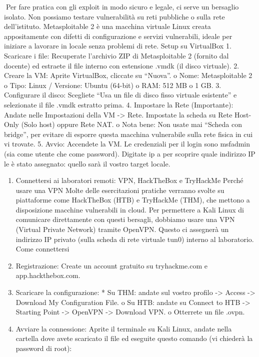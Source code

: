 \documentclass[11pt,a4paper]{article}
\providecommand{\tightlist}{%
  \setlength{\itemsep}{0pt}\setlength{\parskip}{0pt}}
\begin{document}
Per fare pratica con gli exploit in modo sicuro e legale, ci serve un
bersaglio isolato. Non possiamo testare vulnerabilità su reti pubbliche
o sulla rete dell'istituto. Metasploitable 2 è una macchina virtuale
Linux creata appositamente con difetti di configurazione e servizi
vulnerabili, ideale per iniziare a lavorare in locale senza problemi di
rete. Setup su VirtualBox 1. Scaricare i file: Recuperate l'archivio ZIP
di Metasploitable 2 (fornito dal docente) ed estraete il file interno
con estensione .vmdk (il disco virtuale). 2. Creare la VM: Aprite
VirtualBox, cliccate su ``Nuova''. o Nome: Metasploitable 2 o Tipo:
Linux / Versione: Ubuntu (64-bit) o RAM: 512 MB o 1 GB. 3. Configurare
il disco: Scegliete ``Usa un file di disco fisso virtuale esistente'' e
selezionate il file .vmdk estratto prima. 4. Impostare la Rete
(Importante): Andate nelle Impostazioni della VM -\textgreater{} Rete.
Impostate la scheda su Rete Host-Only (Solo host) oppure Rete NAT. o
Nota bene: Non usate mai ``Scheda con bridge'', per evitare di esporre
questa macchina vulnerabile sulla rete fisica in cui vi trovate. 5.
Avvio: Accendete la VM. Le credenziali per il login sono msfadmin (sia
come utente che come password). Digitate ip a per scoprire quale
indirizzo IP le è stato assegnato: quello sarà il vostro target locale.

\begin{enumerate}
\def\labelenumi{\arabic{enumi}.}
\setcounter{enumi}{3}
\tightlist
\item
  Connettersi ai laboratori remoti: VPN, HackTheBox e TryHackMe Perché
  usare una VPN Molte delle esercitazioni pratiche verranno svolte su
  piattaforme come HackTheBox (HTB) e TryHackMe (THM), che mettono a
  disposizione macchine vulnerabili in cloud. Per permettere a Kali
  Linux di comunicare direttamente con questi bersagli, dobbiamo usare
  una VPN (Virtual Private Network) tramite OpenVPN. Questo ci assegnerà
  un indirizzo IP privato (sulla scheda di rete virtuale tun0) interno
  al laboratorio. Come connettersi
\item
  Registrazione: Create un account gratuito su tryhackme.com e
  app.hackthebox.com.
\item
  Scaricare la configurazione: * Su THM: andate sul vostro profilo
  -\textgreater{} Access -\textgreater{} Download My Configuration File.
  o Su HTB: andate su Connect to HTB -\textgreater{} Starting Point
  -\textgreater{} OpenVPN -\textgreater{} Download VPN. o Otterrete un
  file .ovpn.
\item
  Avviare la connessione: Aprite il terminale su Kali Linux, andate
  nella cartella dove avete scaricato il file ed eseguite questo comando
  (vi chiederà la password di root):
\end{enumerate}
\end{document}
